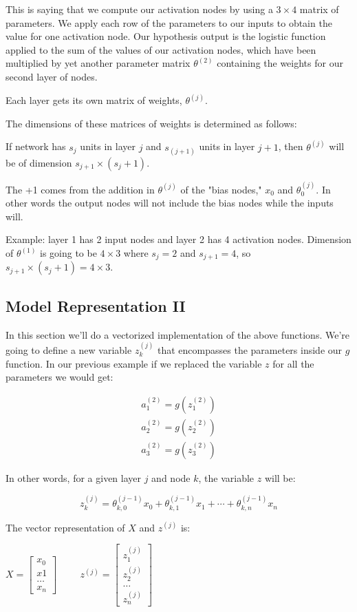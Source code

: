 \documentclass{article}
\begin{document}
This is saying that we compute our activation nodes by using a $3×4$ matrix of parameters. We apply each row of the parameters to our inputs to obtain the value for one activation node. Our hypothesis output is the logistic function applied to the sum of the values of our activation nodes, which have been multiplied by yet another parameter matrix $\theta^{(2)}$ containing the weights for our second layer of nodes.

Each layer gets its own matrix of weights, $\theta^{(j)}$.

The dimensions of these matrices of weights is determined as follows:

If network has $s_j$ units in layer $j$ and $s_{(j+1)}$ units in layer $j+1$, then $\theta^{(j)}$ will be of dimension $s_{j+1}×(s_j+1)$.

The +1 comes from the addition in $\theta^{(j)}$ of the "bias nodes," $x_0$ and $\theta_0^{(j)}$. In other words the output nodes will not include the bias nodes while the inputs will.

Example: layer 1 has 2 input nodes and layer 2 has 4 activation nodes. Dimension of $\theta^{(1)}$ is going to be $4×3$ where $s_j=2$ and $s_{j+1}=4$, so $s_{j+1}×(s_j+1)=4×3$.


\subsection{Model Representation II}

In this section we'll do a vectorized implementation of the above functions. We're going to define a new variable $z_k^{(j)}$ that encompasses the parameters inside our $g$ function. In our previous example if we replaced the variable $z$ for all the parameters we would get:

$$
\begin{matrix}
a_1^{(2)}=g(z_1^{(2)}) \\
a_2^{(2)}=g(z_2^{(2)}) \\
a_3^{(2)}=g(z_3^{(2)})
\end{matrix}
$$

In other words, for a given layer $j$ and node $k$, the variable $z$ will be:

$$z_k^{(j)}=\theta_{k,0}^{(j−1)}x_0+\theta_{k,1}^{(j−1)}x_1+\cdots +\theta_{k,n}^{(j−1)}x_n$$

The vector representation of $X$ and $z^{(j)}$ is:

$X=\left[\begin{matrix}
x_0 \\
x1  \\
\dots \\
x_n
\end{matrix}\right]
\hspace{1cm} z^{(j)}=\left[\begin{matrix}
z_1^{(j)} \\
z_2^{(j)} \\
\dots \\
z_n^{(j)}
\end{matrix}\right]
$
\end{document}
